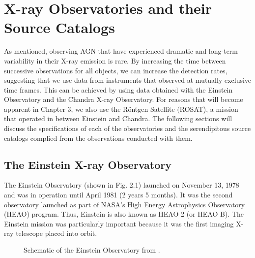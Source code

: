 \chapter{X-ray Observatories and their Source Catalogs}
\label{chap2}

As mentioned, observing AGN that have experienced dramatic and long-term variability in their X-ray emission is rare.
By increasing the time between successive observations for all objects, we can increase the detection rates, suggesting that we use data from instruments that observed at mutually exclusive time frames.
This can be achieved by using data obtained with the Einstein Observatory and the Chandra X-ray Observatory. 
For reasons that will become apparent in Chapter 3, we also use the R\"{o}ntgen Satellite (ROSAT), a mission that operated in between Einstein and Chandra. 
The following sections will discuss the specifications of each of the observatories and the serendipitous source catalogs complied from the observations conducted with them.


\section{The Einstein X-ray Observatory}
\label{sub2_1}

The Einstein Observatory (shown in Fig. 2.1) launched on November 13, 1978 and was in operation until April 1981 (2 years 5 months). 
It was the second observatory launched as part of NASA’s High Energy Astrophysics Observatory (HEAO) program.
Thus, Einstein is also known as HEAO 2 (or HEAO B). 
The Einstein mission was particularly important because it was the first imaging X-ray telescope placed into orbit.

\begin{figure}[H]
\centering
{}
\caption{Schematic of the Einstein Observatory from \cite{giacconietal1979}. }
\label{imbeded_fb}
\end{figure}


